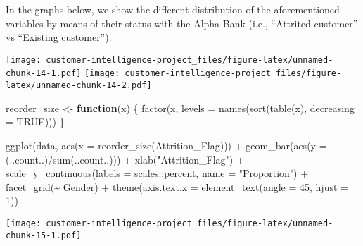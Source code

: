 \documentclass[
]{article}
\newenvironment{Shaded}{\begin{snugshade}}{\end{snugshade}}
\newcommand{\AttributeTok}[1]{\textcolor[rgb]{0.77,0.63,0.00}{#1}}
\newcommand{\ConstantTok}[1]{\textcolor[rgb]{0.00,0.00,0.00}{#1}}
\newcommand{\ControlFlowTok}[1]{\textcolor[rgb]{0.13,0.29,0.53}{\textbf{#1}}}
\newcommand{\DecValTok}[1]{\textcolor[rgb]{0.00,0.00,0.81}{#1}}
\newcommand{\FunctionTok}[1]{\textcolor[rgb]{0.00,0.00,0.00}{#1}}
\newcommand{\NormalTok}[1]{#1}
\newcommand{\OtherTok}[1]{\textcolor[rgb]{0.56,0.35,0.01}{#1}}
\newcommand{\SpecialCharTok}[1]{\textcolor[rgb]{0.00,0.00,0.00}{#1}}
\newcommand{\StringTok}[1]{\textcolor[rgb]{0.31,0.60,0.02}{#1}}
\begin{document}
In the graphs below, we show the different distribution of the
aforementioned variables by means of their status with the Alpha Bank
(i.e., ``Attrited customer'' vs ``Existing customer'').

\texttt{[image: customer-intelligence-project\_files/figure-latex/unnamed-chunk-14-1.pdf]}
\texttt{[image: customer-intelligence-project\_files/figure-latex/unnamed-chunk-14-2.pdf]}

\begin{Shaded}
\begin{Highlighting}[]
\NormalTok{reorder\_size }\OtherTok{\textless{}{-}} \ControlFlowTok{function}\NormalTok{(x) \{}
  \FunctionTok{factor}\NormalTok{(x, }\AttributeTok{levels =} \FunctionTok{names}\NormalTok{(}\FunctionTok{sort}\NormalTok{(}\FunctionTok{table}\NormalTok{(x), }\AttributeTok{decreasing =} \ConstantTok{TRUE}\NormalTok{)))}
\NormalTok{\}}

\FunctionTok{ggplot}\NormalTok{(data, }\FunctionTok{aes}\NormalTok{(}\AttributeTok{x =} \FunctionTok{reorder\_size}\NormalTok{(}\StringTok{\textasciigrave{}}\AttributeTok{Attrition\_Flag}\StringTok{\textasciigrave{}}\NormalTok{))) }\SpecialCharTok{+}
        \FunctionTok{geom\_bar}\NormalTok{(}\FunctionTok{aes}\NormalTok{(}\AttributeTok{y =}\NormalTok{ (..count..)}\SpecialCharTok{/}\FunctionTok{sum}\NormalTok{(..count..))) }\SpecialCharTok{+}
        \FunctionTok{xlab}\NormalTok{(}\StringTok{"Attrition\_Flag"}\NormalTok{) }\SpecialCharTok{+}
        \FunctionTok{scale\_y\_continuous}\NormalTok{(}\AttributeTok{labels =}\NormalTok{ scales}\SpecialCharTok{::}\NormalTok{percent, }\AttributeTok{name =} \StringTok{"Proportion"}\NormalTok{) }\SpecialCharTok{+}
        \FunctionTok{facet\_grid}\NormalTok{(}\SpecialCharTok{\textasciitilde{}}\NormalTok{ Gender) }\SpecialCharTok{+}
        \FunctionTok{theme}\NormalTok{(}\AttributeTok{axis.text.x =} \FunctionTok{element\_text}\NormalTok{(}\AttributeTok{angle =} \DecValTok{45}\NormalTok{, }\AttributeTok{hjust =} \DecValTok{1}\NormalTok{))}
\end{Highlighting}
\end{Shaded}

\texttt{[image: customer-intelligence-project\_files/figure-latex/unnamed-chunk-15-1.pdf]}
\end{document}
